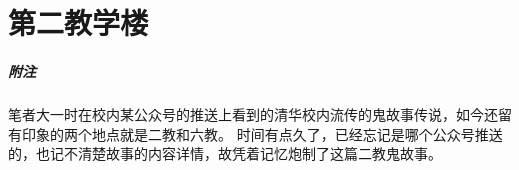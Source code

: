 \chapter{第二教学楼}

\vfill

\paragraph{附注}
笔者大一时在校内某公众号的推送上看到的清华校内流传的鬼故事传说，如今还留有印象的两个地点就是二教和六教。
时间有点久了，已经忘记是哪个公众号推送的，也记不清楚故事的内容详情，故凭着记忆炮制了这篇二教鬼故事。
